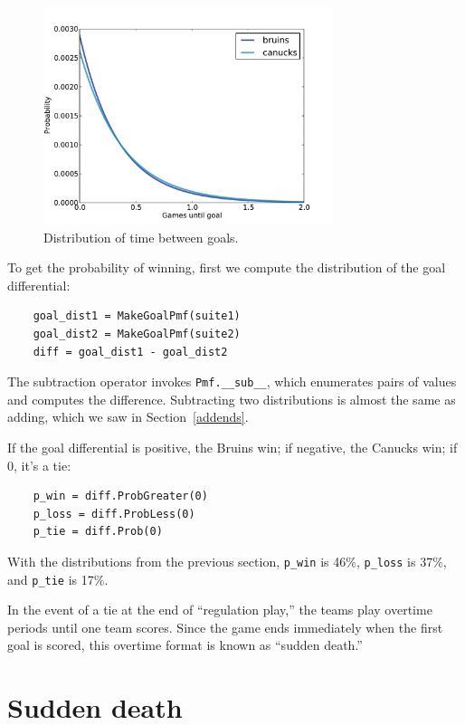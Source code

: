 \documentclass[12pt]{book}
\begin{document}
\begin{figure}
\centerline{\includegraphics[height=2.5in]{figs/hockey3.pdf}}
\caption{Distribution of time between goals.}
\label{fig.hockey3}
\end{figure}

To get the probability of winning, first we compute the
distribution of the goal differential:

\begin{verbatim}
    goal_dist1 = MakeGoalPmf(suite1)
    goal_dist2 = MakeGoalPmf(suite2)
    diff = goal_dist1 - goal_dist2
\end{verbatim}  

The subtraction operator invokes \verb"Pmf.__sub__", which enumerates
pairs of values and computes the difference.  Subtracting two
distributions is almost the same as adding, which we saw in
Section~\ref{addends}.

If the goal differential is positive, the Bruins win; if negative, the
Canucks win; if 0, it's a tie:

\begin{verbatim}
    p_win = diff.ProbGreater(0)
    p_loss = diff.ProbLess(0)
    p_tie = diff.Prob(0)
\end{verbatim}  

With the distributions from the previous section, \verb"p_win"
is 46\%, \verb"p_loss" is 37\%, and \verb"p_tie" is 17\%.

In the event of a tie at the end of ``regulation play,'' the teams play
overtime periods until one team scores.  Since the game ends
immediately when the first goal is scored, this overtime format
is known as ``sudden death.''


\section{Sudden death}
\end{document}
